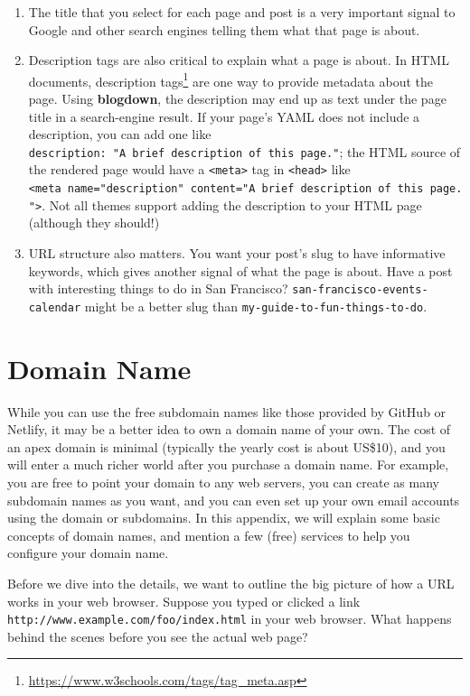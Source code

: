 \documentclass[12pt,]{krantz}
\renewcommand{\href}[2]{#2\footnote{\url{#1}}}
\theoremstyle{definition}
\theoremstyle{definition}
\theoremstyle{definition}
\theoremstyle{remark}
\begin{document}
\begin{enumerate}
\def\labelenumi{\arabic{enumi}.}
\item
  The title that you select for each page and post is a very important
  signal to Google and other search engines telling them what that page
  is about.
\item
  Description tags are also critical to explain what a page is about. In
  HTML documents,
  \href{https://www.w3schools.com/tags/tag_meta.asp}{description tags}
  are one way to provide metadata about the page. Using
  \textbf{blogdown}, the description may end up as text under the page
  title in a search-engine result. If your page's YAML does not include
  a description, you can add one like
  \texttt{description:\ "A\ brief\ description\ of\ this\ page."}; the
  HTML source of the rendered page would have a
  \texttt{\textless{}meta\textgreater{}} tag in
  \texttt{\textless{}head\textgreater{}} like
  \texttt{\textless{}meta\ name="description"\ content="A\ brief\ description\ of\ this\ page."\textgreater{}}.
  Not all themes support adding the description to your HTML page
  (although they should!)
\item
  URL structure also matters. You want your post's slug to have
  informative keywords, which gives another signal of what the page is
  about. Have a post with interesting things to do in San Francisco?
  \texttt{san-francisco-events-calendar} might be a better slug than
  \texttt{my-guide-to-fun-things-to-do}.
\end{enumerate}

\hypertarget{domain-name}{%
\chapter{Domain Name}\label{domain-name}}

While you can use the free subdomain names like those
provided by GitHub or Netlify, it may be a better idea to own a domain
name of your own. The cost of an apex domain is minimal (typically the
yearly cost is about US\$10), and you will enter a much richer world
after you purchase a domain name. For example, you are free to point
your domain to any web servers, you can create as many subdomain names
as you want, and you can even set up your own email accounts using the
domain or subdomains. In this appendix, we will explain some basic
concepts of domain names, and mention a few (free) services to help you
configure your domain name.

Before we dive into the details, we want to outline the big picture of
how a URL works in your web browser. Suppose you typed or clicked a link
\texttt{http://www.example.com/foo/index.html} in your web browser. What
happens behind the scenes before you see the actual web page?
\end{document}
